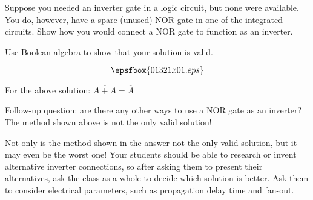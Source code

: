 

Suppose you needed an inverter gate in a logic circuit, but none were available.  You do, however, have a spare (unused) NOR gate in one of the integrated circuits.  Show how you would connect a NOR gate to function as an inverter.

Use Boolean algebra to show that your solution is valid.







$$\epsfbox{01321x01.eps}$$

For the above solution: $\overline{A + A} = \overline{A}$

\vskip 10pt

Follow-up question: are there any other ways to use a NOR gate as an inverter?  The method shown above is not the only valid solution!







Not only is the method shown in the answer not the only valid solution, but it may even be the worst one!  Your students should be able to research or invent alternative inverter connections, so after asking them to present their alternatives, ask the class as a whole to decide which solution is better.  Ask them to consider electrical parameters, such as propagation delay time and fan-out.




